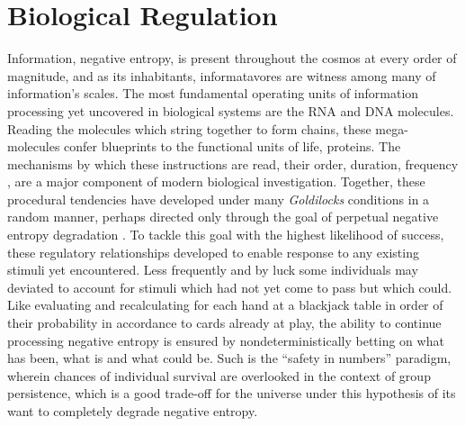 % 
\section{Biological Regulation}
\label{sec:bioreg}
Information, \ie negative entropy, is present throughout the cosmos at every order of magnitude, and as its inhabitants, informatavores are witness among many of information's scales. The most fundamental operating units of information processing yet uncovered in biological systems are the RNA and DNA molecules. Reading the molecules which string together to form chains, these mega-molecules confer blueprints to the functional units of life, proteins. The mechanisms by which these instructions are read, \eg their order, duration, frequency \etc, are a major component of modern biological investigation. Together, these procedural tendencies have developed under many \emph{Goldilocks} conditions in a random manner, perhaps directed only through the goal of perpetual negative entropy degradation \citep{england2013statistical}. To tackle this goal with the highest likelihood of success, these regulatory relationships developed to enable response to any existing stimuli yet encountered. Less frequently and by luck some individuals may deviated to account for stimuli which had not yet come to pass but which could. Like evaluating and recalculating for each hand at a blackjack table in order of their probability in accordance to cards already at play, the ability to continue processing negative entropy is ensured by nondeterministically betting on what has been, what is and what could be. Such is the ``safety in numbers'' paradigm, wherein chances of individual survival are overlooked in the context of group persistence, which is a good trade-off for the universe under this hypothesis of its want to completely degrade negative entropy.

